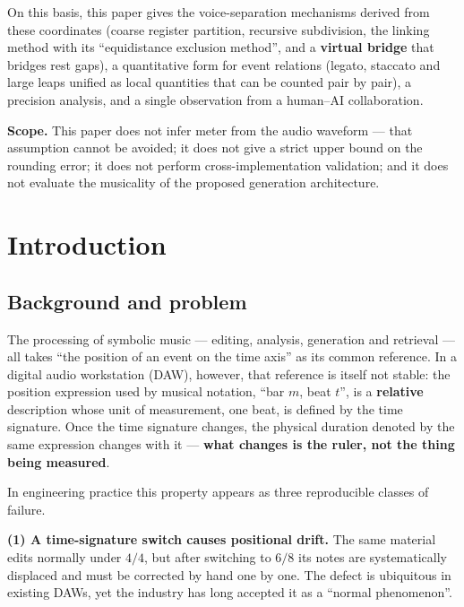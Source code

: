 \documentclass[11pt,a4paper]{article}
\begin{document}
\begin{abstracten}
On this basis, this paper gives the voice-separation mechanisms derived from
these coordinates (coarse register partition, recursive subdivision, the linking
method with its ``equidistance exclusion method'', and a \textbf{virtual bridge}
that bridges rest gaps), a quantitative form for event relations (legato,
staccato and large leaps unified as local quantities that can be counted pair by
pair), a precision analysis, and a single observation from a human--AI
collaboration.

\textbf{Scope.} This paper does not infer meter from the audio waveform --- that
assumption cannot be avoided; it does not give a strict upper bound on the
rounding error; it does not perform cross-implementation validation; and it does
not evaluate the musicality of the proposed generation architecture.
\end{abstracten}


\clearpage

\tableofcontents
\clearpage
\section{Introduction}
\subsection{Background and problem}

The processing of symbolic music --- editing, analysis, generation and retrieval ---
all takes ``the position of an event on the time axis'' as its common reference.
In a digital audio workstation (DAW), however, that reference is itself not stable:
the position expression used by musical notation, ``bar $m$, beat $t$'', is a
\textbf{relative} description whose unit of measurement, one beat, is defined by the
time signature. Once the time signature changes, the physical duration denoted by the
same expression changes with it --- \textbf{what changes is the ruler, not the thing
being measured}.

In engineering practice this property appears as three reproducible classes of
failure.

\textbf{(1) A time-signature switch causes positional drift.} The same material edits
normally under $4/4$, but after switching to $6/8$ its notes are systematically
displaced and must be corrected by hand one by one. The defect is ubiquitous in
existing DAWs, yet the industry has long accepted it as a ``normal phenomenon''.
\end{document}
